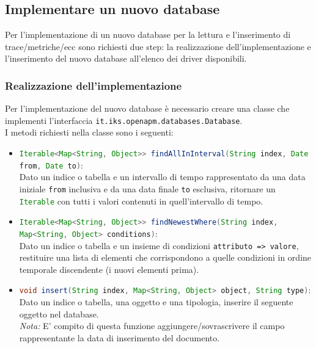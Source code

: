 	\subsection{Implementare un nuovo database}
	\label{newdatabase}

		Per l'implementazione di un nuovo database per la lettura e l'inserimento 
		di trace/metriche/ecc sono richiesti due step: la realizzazione dell'implementazione
		e l'inserimento del nuovo database all'elenco dei driver disponibili.

		\subsubsection{Realizzazione dell'implementazione}

			Per l'implementazione del nuovo database è necessario creare una classe che 
			implementi l'interfaccia \lstinline{it.iks.openapm.databases.Database}.\\
			I metodi richiesti nella classe sono i seguenti:
			\begin{itemize}
				\item \lstinline[columns=fixed, language=Java]{Iterable<Map<String, Object>> findAllInInterval(String index, Date from, Date to)}:\\
					Dato un indice o tabella e un intervallo di tempo rappresentato da una 
					data iniziale \lstinline{from} inclusiva e da una data finale \lstinline{to} esclusiva, 
					ritornare un \lstinline[language=Java]{Iterable} con tutti i valori contenuti in quell'intervallo 
					di tempo.
					
				\item 
				\lstinline[columns=fixed, language=Java]{Iterable<Map<String, Object>> findNewestWhere(String index, Map<String, Object> conditions)}:\\
					Dato un indice o tabella e un insieme di condizioni \lstinline{attributo => valore}, restituire 
					una lista di elementi che corrispondono a quelle condizioni in ordine temporale 
					discendente (i nuovi elementi prima).
					
				\item 
				\lstinline[columns=fixed, language=Java]{void insert(String index, Map<String, Object> object, String type)}:\\
					Dato un indice o tabella, una oggetto e una tipologia, inserire il seguente oggetto 
					nel database.\\
					\textit{Nota:} E' compito di questa funzione aggiungere/sovrascrivere il campo rappresentante 
					la data di inserimento del documento.
					
			
			\end{itemize}


